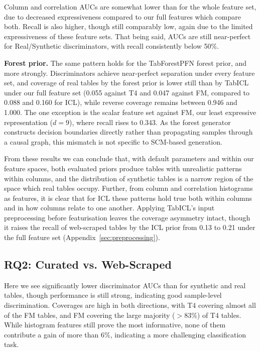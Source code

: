 \documentclass{article}
\begin{document}
Column and correlation AUCs are somewhat lower than for the whole feature set, due to decreased expressiveness compared to our full features which compare both.
Recall is also higher, though still comparably low, again due to the limited expressiveness of these feature sets.
That being said, AUCs are still near-perfect for Real/Synthetic discriminators, with recall consistently below 50\%.

\textbf{Forest prior.} The same pattern holds for the TabForestPFN forest prior, and more strongly.
Discriminators achieve near-perfect separation under every feature set, and coverage of real tables by the forest prior is lower still than by TabICL under our full feature set (0.055 against T4 and 0.047 against FM, compared to 0.088 and 0.160 for ICL), while reverse coverage remains between 0.946 and 1.000.
The one exception is the scalar feature set against FM, our least expressive representation ($d = 9$), where recall rises to 0.343.
As the forest generator constructs decision boundaries directly rather than propagating samples through a causal graph, this mismatch is not specific to SCM-based generation.

From these results we can conclude that, with default parameters and within our feature spaces, both evaluated priors produce tables with unrealistic patterns within columns, and the distribution of synthetic tables is a narrow region of the space which real tables occupy.
Further, from column and correlation histograms as features, it is clear that for ICL these patterns hold true both within columns and in how columns relate to one another.
Applying TabICL's input preprocessing before featurisation leaves the coverage asymmetry intact, though it raises the recall of web-scraped tables by the ICL prior from 0.13 to 0.21 under the full feature set (Appendix~\ref{sec:preprocessing}).

\subsection{RQ2: Curated vs. Web-Scraped}

Here we see significantly lower discriminator AUCs than for synthetic and real tables, though performance is still strong, indicating good sample-level discrimination.
Coverages are high in both directions, with T4 covering almost all of the FM tables, and FM covering the large majority ($>83\%$) of T4 tables.
While histogram features still prove the most informative, none of them contribute a gain of more than 6\%, indicating a more challenging classification task.
\end{document}

